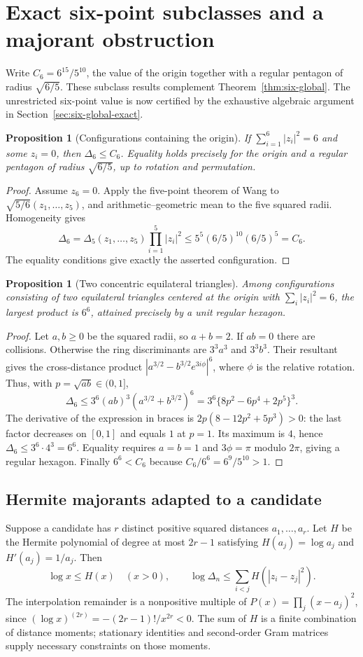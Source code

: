 \documentclass[11pt]{article}
\newtheorem{proposition}[theorem]{Proposition}
\theoremstyle{remark}
\numberwithin{equation}{section}
\begin{document}
\section{Exact six-point subclasses and a majorant obstruction}
Write $C_6=6^{15}/5^{10}$, the value of the origin together with a
regular pentagon of radius $\sqrt{6/5}$. These subclass results
complement Theorem~\ref{thm:six-global}.
The unrestricted six-point value is now certified by the exhaustive
algebraic argument in Section~\ref{sec:six-global-exact}.

\begin{proposition}[Configurations containing the origin]
If $\sum_{i=1}^6|z_i|^2=6$ and some $z_i=0$, then $\Delta_6\le C_6$.
Equality holds precisely for the origin and a regular pentagon of
radius $\sqrt{6/5}$, up to rotation and permutation.
\end{proposition}
\begin{proof}
Assume $z_6=0$. Apply the five-point theorem of Wang \cite{Wang} to
$\sqrt{5/6}(z_1,\ldots,z_5)$, and arithmetic--geometric mean to
the five squared radii. Homogeneity gives
\[
 \Delta_6=\Delta_5(z_1,\ldots,z_5)\prod_{i=1}^5|z_i|^2
 \le5^5(6/5)^{10}(6/5)^5=C_6.
\]
The equality conditions give exactly the asserted configuration.
\end{proof}

\begin{proposition}[Two concentric equilateral triangles]
Among configurations consisting of two equilateral triangles centered
at the origin with $\sum_i|z_i|^2=6$, the largest product is $6^6$,
attained precisely by a unit regular hexagon.
\end{proposition}
\begin{proof}
Let $a,b\ge0$ be the squared radii, so $a+b=2$.
If $ab=0$ there are collisions. Otherwise the ring discriminants are
$3^3a^3$ and $3^3b^3$. Their resultant gives the cross-distance product
$|a^{3/2}-b^{3/2}e^{3i\phi}|^6$, where $\phi$ is the relative rotation.
Thus, with $p=\sqrt{ab}\in(0,1]$,
\[
 \Delta_6\le3^6(ab)^3(a^{3/2}+b^{3/2})^6
 =3^6\{8p^2-6p^4+2p^5\}^3.
\]
The derivative of the expression in braces is
$2p(8-12p^2+5p^3)>0$: the last factor decreases on $[0,1]$
and equals $1$ at $p=1$. Its maximum is $4$, hence
$\Delta_6\le3^6\cdot4^3=6^6$.
Equality requires $a=b=1$ and $3\phi=\pi$ modulo $2\pi$,
giving a regular hexagon. Finally $6^6<C_6$ because
$C_6/6^6=6^9/5^{10}>1$.
\end{proof}

\subsection{Hermite majorants adapted to a candidate}
Suppose a candidate has $r$ distinct positive squared distances
$a_1,\ldots,a_r$. Let $H$ be the Hermite polynomial of degree at
most $2r-1$ satisfying $H(a_j)=\log a_j$ and $H'(a_j)=1/a_j$.
Then
\[
 \log x\le H(x)\quad(x>0),\qquad
 \log\Delta_n\le\sum_{i<j}H(|z_i-z_j|^2).
\]
The interpolation remainder is a nonpositive multiple of
$P(x)=\prod_j(x-a_j)^2$, since
$(\log x)^{(2r)}=-(2r-1)!/x^{2r}<0$.
The sum of $H$ is a finite combination of distance moments;
stationary identities and second-order Gram matrices supply
necessary constraints on those moments.
\end{document}
